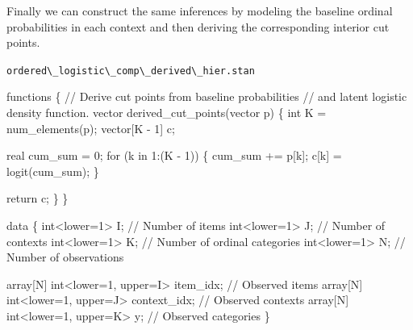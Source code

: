 \documentclass[
  letterpaper,
  DIV=11,
  numbers=noendperiod]{scrartcl}
\newenvironment{Shaded}{\begin{snugshade}}{\end{snugshade}}
\newcommand{\CommentTok}[1]{\textcolor[rgb]{0.37,0.37,0.37}{#1}}
\newcommand{\ControlFlowTok}[1]{\textcolor[rgb]{0.00,0.23,0.31}{#1}}
\newcommand{\DataTypeTok}[1]{\textcolor[rgb]{0.68,0.00,0.00}{#1}}
\newcommand{\DecValTok}[1]{\textcolor[rgb]{0.68,0.00,0.00}{#1}}
\newcommand{\KeywordTok}[1]{\textcolor[rgb]{0.00,0.23,0.31}{#1}}
\newcommand{\NormalTok}[1]{\textcolor[rgb]{0.00,0.23,0.31}{#1}}
\begin{document}
Finally we can construct the same inferences by modeling the baseline
ordinal probabilities in each context and then deriving the
corresponding interior cut points.

\begin{codelisting}

\caption{\texttt{ordered\textbackslash\_logistic\textbackslash\_comp\textbackslash\_derived\textbackslash\_hier.stan}}

\begin{Shaded}
\begin{Highlighting}[]
\KeywordTok{functions}\NormalTok{ \{}
  \CommentTok{// Derive cut points from baseline probabilities}
  \CommentTok{// and latent logistic density function.}
  \DataTypeTok{vector}\NormalTok{ derived\_cut\_points(}\DataTypeTok{vector}\NormalTok{ p) \{}
    \DataTypeTok{int}\NormalTok{ K = num\_elements(p);}
    \DataTypeTok{vector}\NormalTok{[K {-} }\DecValTok{1}\NormalTok{] c;}

    \DataTypeTok{real}\NormalTok{ cum\_sum = }\DecValTok{0}\NormalTok{;}
    \ControlFlowTok{for}\NormalTok{ (k }\ControlFlowTok{in} \DecValTok{1}\NormalTok{:(K {-} }\DecValTok{1}\NormalTok{)) \{}
\NormalTok{      cum\_sum += p[k];}
\NormalTok{      c[k] = logit(cum\_sum);}
\NormalTok{    \}}

    \ControlFlowTok{return}\NormalTok{ c;}
\NormalTok{  \}}
\NormalTok{\}}

\KeywordTok{data}\NormalTok{ \{}
  \DataTypeTok{int}\NormalTok{\textless{}}\KeywordTok{lower}\NormalTok{=}\DecValTok{1}\NormalTok{\textgreater{} I; }\CommentTok{// Number of items}
  \DataTypeTok{int}\NormalTok{\textless{}}\KeywordTok{lower}\NormalTok{=}\DecValTok{1}\NormalTok{\textgreater{} J; }\CommentTok{// Number of contexts}
  \DataTypeTok{int}\NormalTok{\textless{}}\KeywordTok{lower}\NormalTok{=}\DecValTok{1}\NormalTok{\textgreater{} K; }\CommentTok{// Number of ordinal categories}
  \DataTypeTok{int}\NormalTok{\textless{}}\KeywordTok{lower}\NormalTok{=}\DecValTok{1}\NormalTok{\textgreater{} N; }\CommentTok{// Number of observations}

  \DataTypeTok{array}\NormalTok{[N] }\DataTypeTok{int}\NormalTok{\textless{}}\KeywordTok{lower}\NormalTok{=}\DecValTok{1}\NormalTok{, }\KeywordTok{upper}\NormalTok{=I\textgreater{} item\_idx;    }\CommentTok{// Observed items}
  \DataTypeTok{array}\NormalTok{[N] }\DataTypeTok{int}\NormalTok{\textless{}}\KeywordTok{lower}\NormalTok{=}\DecValTok{1}\NormalTok{, }\KeywordTok{upper}\NormalTok{=J\textgreater{} context\_idx; }\CommentTok{// Observed contexts}
  \DataTypeTok{array}\NormalTok{[N] }\DataTypeTok{int}\NormalTok{\textless{}}\KeywordTok{lower}\NormalTok{=}\DecValTok{1}\NormalTok{, }\KeywordTok{upper}\NormalTok{=K\textgreater{} y;           }\CommentTok{// Observed categories}
\NormalTok{\}}


\end{Highlighting}
\end{Shaded}
\end{codelisting}
\end{document}
